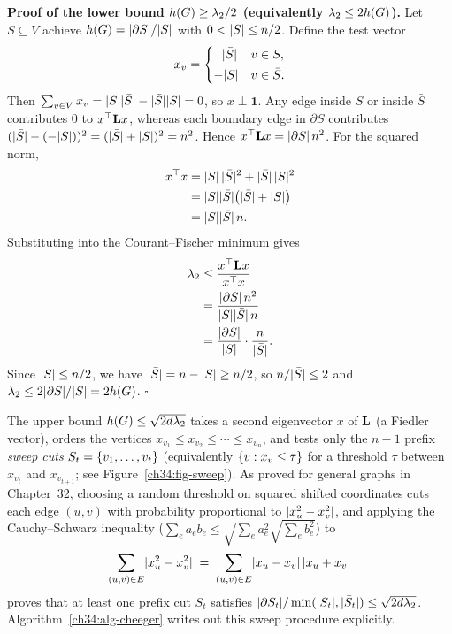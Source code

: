 \begin{whybox}
\textbf{Proof of the lower bound $h(G)\ge \lambda_2/2$ (equivalently $\lambda_2\le 2h(G)$).} Let $S\subseteq V$ achieve $h(G)=\lvert\partial S\rvert/\lvert S\rvert$ with $0<\lvert S\rvert\le n/2$. Define the test vector
\[
  x_v=\begin{cases}\ \ \lvert\bar S\rvert & v\in S,\\[2pt] -\lvert S\rvert & v\in\bar S.\end{cases}
\]
Then $\sum_{v\in V} x_v=\lvert S\rvert\lvert\bar S\rvert-\lvert\bar S\rvert\lvert S\rvert=0$, so $x\perp\mathbf{1}$. Any edge inside $S$ or inside $\bar S$ contributes $0$ to $x^\top\mathbf{L} x$, whereas each boundary edge in $\partial S$ contributes $(\lvert\bar S\rvert-(-\lvert S\rvert))^2=(\lvert\bar S\rvert+\lvert S\rvert)^2=n^2$. Hence $x^\top\mathbf{L} x=\lvert\partial S\rvert\,n^2$. For the squared norm,
\begin{align*}
  x^\top x &= \lvert S\rvert\,\lvert\bar S\rvert^2 + \lvert\bar S\rvert\,\lvert S\rvert^2 \\
           &= \lvert S\rvert\lvert\bar S\rvert\bigl(\lvert\bar S\rvert+\lvert S\rvert\bigr) \\
           &= \lvert S\rvert\lvert\bar S\rvert\,n.
\end{align*}
Substituting into the Courant--Fischer minimum gives
\begin{align*}
  \lambda_2 &\le \frac{x^\top\mathbf{L} x}{x^\top x} \\
            &= \frac{\lvert\partial S\rvert\,n^2}{\lvert S\rvert\lvert\bar S\rvert\,n} \\
            &= \frac{\lvert\partial S\rvert}{\lvert S\rvert}\cdot\frac{n}{\lvert\bar S\rvert}.
\end{align*}
Since $\lvert S\rvert\le n/2$, we have $\lvert\bar S\rvert=n-\lvert S\rvert\ge n/2$, so $n/\lvert\bar S\rvert\le 2$ and $\lambda_2\le 2\lvert\partial S\rvert/\lvert S\rvert=2h(G)$. \hfill$\square$
\end{whybox}

The upper bound $h(G)\le\sqrt{2d\lambda_2}$ takes a second eigenvector $x$ of $\mathbf{L}$ (a Fiedler vector), orders the vertices $x_{v_1}\le x_{v_2}\le\cdots\le x_{v_n}$, and tests only the $n-1$ prefix \emph{sweep cuts} $S_t=\{v_1,\dots,v_t\}$ (equivalently $\{v : x_v \le \tau\}$ for a threshold $\tau$ between $x_{v_t}$ and $x_{v_{t+1}}$; see Figure~\ref{ch34:fig-sweep}). As proved for general graphs in Chapter~32, choosing a random threshold on squared shifted coordinates cuts each edge $(u,v)$ with probability proportional to $\lvert x_u^2-x_v^2\rvert$, and applying the Cauchy--Schwarz inequality ($\sum_e a_e b_e \le \sqrt{\sum_e a_e^2}\sqrt{\sum_e b_e^2}$) to
\[
  \sum_{(u,v)\in E}\lvert x_u^2-x_v^2\rvert \;=\; \sum_{(u,v)\in E}\lvert x_u-x_v\rvert\,\lvert x_u+x_v\rvert
\]
proves that at least one prefix cut $S_t$ satisfies $\lvert\partial S_t\rvert/\min(\lvert S_t\rvert,\lvert\bar S_t\rvert)\le\sqrt{2d\lambda_2}$. Algorithm~\ref{ch34:alg-cheeger} writes out this sweep procedure explicitly.


